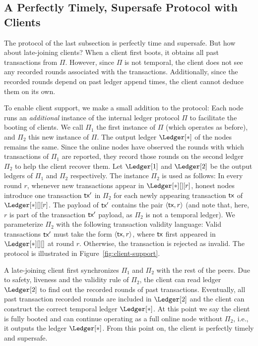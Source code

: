 \subsection{A Perfectly Timely, Supersafe Protocol with Clients}

The protocol of the last subsection is perfectly time and supersafe.
But how about late-joining clients?
When a client first boots, it obtains all past transactions
from $\Pi$.
However, since $\Pi$ is not temporal, the client does not see any recorded rounds
associated with the transactions. Additionally, since the recorded rounds depend
on past ledger append times, the client cannot deduce them on its own.

To enable client support, we make a small addition to the protocol:
Each node runs an \emph{additional} instance of the internal
ledger protocol $\Pi$
to facilitate the booting of clients.
We call $\Pi_1$ the first instance of $\Pi$
(which operates as before),
and $\Pi_2$ this new instance of $\Pi$.
The output ledger $\Ledger[*]$ of the nodes remains the same.
Since the online nodes have observed the rounds with which
transactions of $\Pi_1$ are reported, they record those
rounds on the second ledger $\Pi_2$ to help the client
recover them.
Let $\Ledger[1]$ and $\Ledger[2]$ be the output ledgers
of $\Pi_1$ and $\Pi_2$ respectively.
The instance $\Pi_2$ is used as follows:
In every round $r$,
whenever new transactions appear in $\Ledger[*][][r]$,
honest nodes introduce one transaction $\textsf{tx}'$ in $\Pi_2$
for each newly appearing transaction $\textsf{tx}$ of $\Ledger[*][][r]$.
The payload of $\textsf{tx}'$ contains the pair $\left<\textsf{tx}, r\right>$
(and note that, here, $r$ is part of the transaction $\textsf{tx}'$ payload,
as $\Pi_2$ is not a temporal ledger).
We parameterize $\Pi_2$ with the following transaction validity language:
Valid transactions $\textsf{tx}'$ must take the form $\left<\textsf{tx}, r\right>$,
where $\textsf{tx}$ first appeared in $\Ledger[*][][]$ at round $r$.
Otherwise, the transaction is rejected as invalid.
The protocol is illustrated in Figure~\ref{fig:client-support}.

A late-joining client first synchronizes $\Pi_1$ and $\Pi_2$ with the rest
of the peers.
Due to safety, liveness and the validity rule of $\Pi_2$,
the client can read ledger $\Ledger[2]$ to find out the
recorded rounds of past transactions.
Eventually, all past transaction recorded rounds are included in $\Ledger[2]$
and the client can construct the correct temporal ledger $\Ledger[*]$.
At this point we say the client is fully booted and can continue
operating as a full online node without $\Pi_2$, i.e., it outputs the ledger $\Ledger[*]$.
From this point on, the client is perfectly timely and supersafe.

